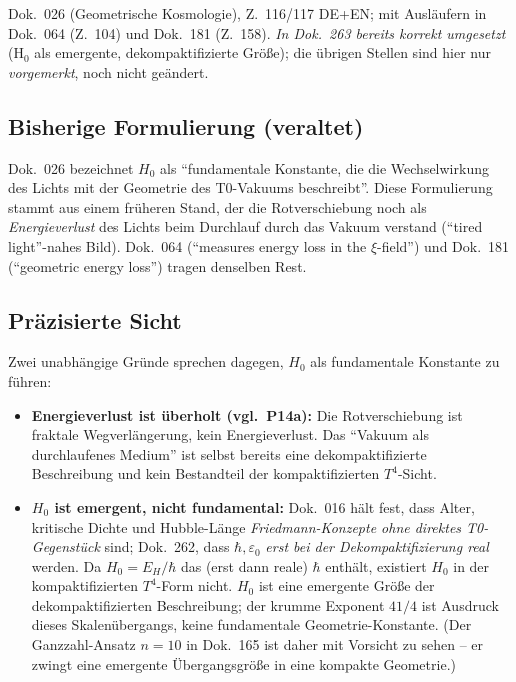Dok.~026 (Geometrische Kosmologie), Z.~116/117 DE+EN; mit Ausläufern in
Dok.~064 (Z.~104) und Dok.~181 (Z.~158). \emph{In Dok.~263 bereits korrekt
umgesetzt} (H$_0$ als emergente, dekompaktifizierte Größe); die übrigen
Stellen sind hier nur \emph{vorgemerkt}, noch nicht geändert.

\subsection*{Bisherige Formulierung (veraltet)}

Dok.~026 bezeichnet $H_0$ als \enquote{fundamentale Konstante, die die
Wechselwirkung des Lichts mit der Geometrie des T0-Vakuums beschreibt}. Diese
Formulierung stammt aus einem früheren Stand, der die Rotverschiebung noch als
\emph{Energieverlust} des Lichts beim Durchlauf durch das Vakuum verstand
(\enquote{tired light}-nahes Bild). Dok.~064 (\enquote{measures energy loss in
the $\xi$-field}) und Dok.~181 (\enquote{geometric energy loss}) tragen
denselben Rest.

\subsection*{Präzisierte Sicht}

Zwei unabhängige Gründe sprechen dagegen, $H_0$ als fundamentale Konstante zu
führen:
\begin{itemize}
  \item \textbf{Energieverlust ist überholt (vgl.\ P14a):} Die
        Rotverschiebung ist fraktale Wegverlängerung, kein Energieverlust. Das
        \enquote{Vakuum als durchlaufenes Medium} ist selbst bereits eine
        dekompaktifizierte Beschreibung und kein Bestandteil der
        kompaktifizierten $T^4$-Sicht.
  \item \textbf{$H_0$ ist emergent, nicht fundamental:} Dok.~016 hält fest,
        dass Alter, kritische Dichte und Hubble-Länge \emph{Friedmann-Konzepte
        ohne direktes T0-Gegenstück} sind; Dok.~262, dass $\hbar, \varepsilon_0$
        \emph{erst bei der Dekompaktifizierung real} werden. Da $H_0 = E_H/\hbar$
        das (erst dann reale) $\hbar$ enthält, existiert $H_0$ in der
        kompaktifizierten $T^4$-Form nicht. $H_0$ ist eine emergente Größe der
        dekompaktifizierten Beschreibung; der krumme Exponent $41/4$ ist
        Ausdruck dieses Skalenübergangs, keine fundamentale Geometrie-Konstante.
        (Der Ganzzahl-Ansatz $n=10$ in Dok.~165 ist daher mit Vorsicht zu sehen
        -- er zwingt eine emergente Übergangsgröße in eine kompakte Geometrie.)
\end{itemize}

